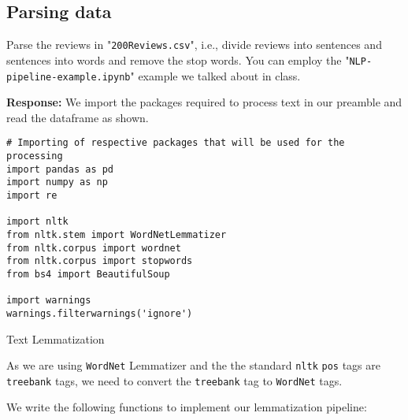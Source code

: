 \documentclass[12pt, letterpaper]{article}
\newcommand{\mybox}[1]{\par\noindent\colorbox{shadecolor}
{\parbox{\dimexpr\textwidth-2\fboxsep\relax}{#1}}}
\begin{document}
\subsection{Parsing data}
\mybox{Parse the reviews in "\texttt{200Reviews.csv}", i.e., divide reviews into sentences and sentences into words and remove the stop words. You can employ the "\texttt{NLP-pipeline-example.ipynb}" example we talked about in class.}

\textbf{Response:} We import the packages required to process text in our preamble and read the dataframe as shown.

\begin{mdframed}[backgroundcolor=shadecolor]
\begin{verbatim}
# Importing of respective packages that will be used for the processing
import pandas as pd
import numpy as np
import re

import nltk
from nltk.stem import WordNetLemmatizer
from nltk.corpus import wordnet
from nltk.corpus import stopwords
from bs4 import BeautifulSoup

import warnings
warnings.filterwarnings('ignore')
\end{verbatim}
\end{mdframed}

{\large Text Lemmatization}

As we are using \texttt{WordNet} Lemmatizer and the the standard \texttt{nltk} \texttt{pos} tags are \texttt{treebank} tags, we need to convert the \texttt{treebank} tag to \texttt{WordNet} tags.

We write the following functions to implement our lemmatization pipeline:
\end{document}
